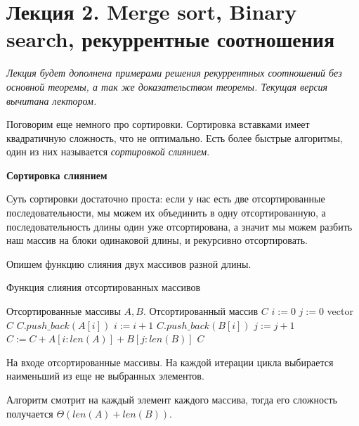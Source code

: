 \documentclass[../main.tex]{subfiles}
\begin{document}
	\section{Лекция 2. Merge sort, Binary search, рекуррентные соотношения}
	
	\textit{Лекция будет дополнена примерами решения рекуррентных соотношений без основной теоремы, а так же доказательством теоремы. Текущая версия вычитана лектором.}

	Поговорим еще немного про сортировки. Сортировка вставками имеет квадратичную сложность, что не оптимально. Есть более быстрые алгоритмы, один из них называется \textit{сортировкой слиянием}.
	
	\textbf{Сортировка слиянием}
	
	Суть сортировки достаточно проста: если у нас есть две отсортированные последовательности, мы можем их объединить в одну отсортированную, а последовательность длины один уже отсортирована, а значит мы можем разбить наш массив на блоки одинаковой длины, и рекурсивно отсортировать.
	
	
	Опишем функцию слияния двух массивов разной длины.
	\begin{algorithm}[H]
		\caption{Функция слияния отсортированных массивов}
		\begin{algorithmic}[1]
			\Require Отсортированные массивы $A, B$.
			\Ensure Отсортированный массив $C$
				\State $ i := 0 $
				\State $ j := 0 $
				\State vector $C$
						\State $C.push\_back(A[i])$
						\State $i := i + 1$
					\Else
						\State $C.push\_back(B[i])$
						\State $j := j + 1$
					\EndIf
				\EndWhile
				\State $ C := C + A[i:len(A)] + B[j:len(B)]$
				\State \Return $C$
			\EndFunction
		\end{algorithmic}
	\end{algorithm}

		
	\begin{proof_cor}
		На входе отсортированные массивы. На каждой итерации цикла выбирается наименьший из еще не выбранных элементов.
	\end{proof_cor}
	\begin{time}
		Алгоритм смотрит на каждый элемент каждого массива, тогда его сложность получается $\Theta(len(A) + len(B))$.
	\end{time}	
\end{document}
